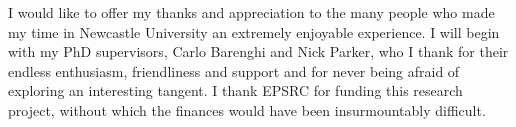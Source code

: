 \begin{acknowledgements}
 I would like to offer my thanks and appreciation to the many people who made my time in Newcastle University an extremely enjoyable experience. I will begin with my PhD supervisors, Carlo Barenghi and Nick Parker, who I thank for their endless enthusiasm, friendliness and support and for never being afraid of exploring an interesting tangent. I thank EPSRC for funding this research project, without which the finances would have been insurmountably difficult.


\end{acknowledgements}
\thispagestyle{empty}
